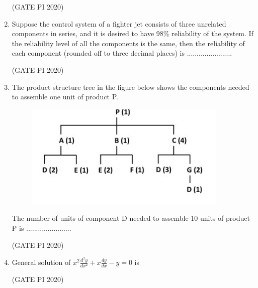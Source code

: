\documentclass[journal,12pt,onecolumn]{IEEEtran}
\theoremstyle{remark}
\begin{document}
\begin{enumerate}
\hfill (GATE PI 2020)

\item Suppose the control system of a fighter jet consists of three unrelated components in series, and it is desired to have 98\% reliability of the system. If the reliability level of all the components is the same, then the reliability of each component (rounded off to three decimal places) is .......................

\hfill (GATE PI 2020)

\item The product structure tree in the figure below shows the components needed to assemble one unit of product P.

\begin{figure}[h]
    \centering
    \includegraphics[width=0.5\columnwidth]{figs/fig10.png}
    \caption{}
    \label{fig:placeholder}
\end{figure}

The number of units of component D needed to assemble 10 units of product P is .......................

\hfill (GATE PI 2020)

\item General solution of $x^2 \frac{d^2 y}{dx^2} + x \frac{dy}{dx} - y = 0$ is
\begin{enumerate}
\end{enumerate}

\hfill (GATE PI 2020)


\end{enumerate}
\end{document}
